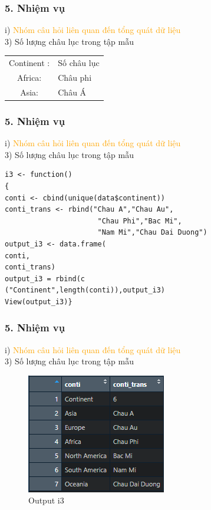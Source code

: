 \documentclass[english,10pt,table]{beamer}
\begin{document}
\begin{frame}[fragile]
\frametitle{5.  Nhiệm vụ}
	i) \textcolor{orange}{Nhóm câu hỏi liên quan đến tổng quát dữ liệu}\\
	3) Số lượng châu lục trong tập mẫu
		\begin{center}
			\begin{tabular}{ c l }
				Continent : & Số châu lục \\ 
				Africa: & Châu phi \\ 
				Asia: & Châu Á \\
			\end{tabular}
		\end{center}
\end{frame}

\begin{frame}[fragile]
\frametitle{5.  Nhiệm vụ}
	i) \textcolor{orange}{Nhóm câu hỏi liên quan đến tổng quát dữ liệu}\\
	3) Số lượng châu lục trong tập mẫu
		\begin{lstlisting}[frame=single]  
i3 <- function()
{
conti <- cbind(unique(data$continent))
conti_trans <- rbind("Chau A","Chau Au",
                      "Chau Phi","Bac Mi",
                      "Nam Mi","Chau Dai Duong")
output_i3 <- data.frame(
conti,
conti_trans)
output_i3 = rbind(c
("Continent",length(conti)),output_i3)
View(output_i3)}
	\end{lstlisting}
\end{frame}

\begin{frame}[fragile]
\frametitle{5.  Nhiệm vụ}
	i) \textcolor{orange}{Nhóm câu hỏi liên quan đến tổng quát dữ liệu}\\
	3) Số lượng châu lục trong tập mẫu
\begin{figure}[h!]
	\begin{center}
		    \includegraphics[scale = 0.7]{Images/I/I3.png}
		            \caption{Output i3}
		\end{center}
		\end{figure}
\end{frame}
\end{document}
